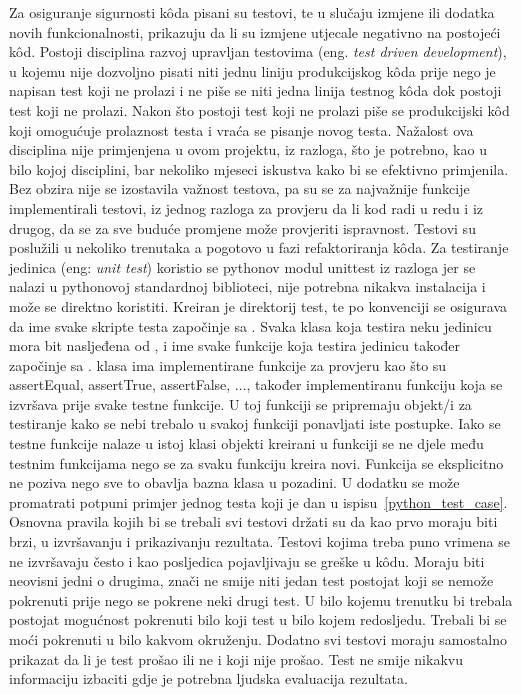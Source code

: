 Za osiguranje sigurnosti k\^oda pisani su testovi, te u slučaju izmjene ili dodatka novih funkcionalnosti, prikazuju da li su izmjene utjecale negativno na postojeći k\^od. Postoji disciplina razvoj upravljan testovima (eng. \textit{test driven development}), u kojemu nije dozvoljno pisati niti jednu liniju produkcijskog k\^oda prije nego je napisan test koji ne prolazi i ne piše se niti jedna linija testnog k\^oda dok postoji test koji ne prolazi. Nakon što postoji test koji ne prolazi piše se produkcijski k\^od koji omogućuje prolaznost testa i vraća se pisanje novog testa. Nažalost ova disciplina nije primjenjena u ovom projektu, iz razloga, što je potrebno, kao u bilo kojoj disciplini, bar nekoliko mjeseci iskustva kako bi se efektivno primjenila. Bez obzira nije se izostavila važnost testova, pa su se za najvažnije funkcije implementirali testovi, iz jednog razloga za provjeru da li kod radi u redu i iz drugog, da se za sve buduće promjene može provjeriti ispravnost. Testovi su poslužili u nekoliko trenutaka a pogotovo u fazi refaktoriranja k\^oda. Za testiranje jedinica (eng: \textit{unit test}) koristio se pythonov modul unittest iz razloga jer se nalazi u pythonovoj standardnoj biblioteci, nije potrebna nikakva instalacija i može se direktno koristiti. Kreiran je direktorij test, te po konvenciji se osigurava da ime svake skripte testa započinje sa . Svaka klasa koja testira neku jedinicu mora bit nasljeđena od , i ime svake funkcije koja testira jedinicu također započinje sa .  klasa ima implementirane funkcije za provjeru kao što su assertEqual, assertTrue, assertFalse, ..., također implementiranu funkciju  koja se izvršava prije svake testne funkcije. U toj funkciji se pripremaju objekt/i za testiranje kako se nebi trebalo u svakoj funkciji ponavljati iste postupke. Iako se testne funkcije nalaze u istoj klasi objekti kreirani u  funkciji se ne djele među testnim funkcijama nego se za svaku funkciju kreira novi. Funkcija  se eksplicitno ne poziva nego sve to obavlja bazna klasa  u pozadini. U dodatku se može promatrati potpuni primjer jednog testa koji je dan u ispisu~\ref{python_test_case}. Osnovna pravila kojih bi se trebali svi testovi držati su da kao prvo moraju biti brzi, u izvršavanju i prikazivanju rezultata. Testovi kojima treba puno vrimena se ne izvršavaju često i kao posljedica pojavljivaju se greške u k\^odu. Moraju biti neovisni jedni o drugima, znači ne smije niti jedan test postojat koji se nemože pokrenuti prije nego se pokrene neki drugi test. U bilo kojemu trenutku bi trebala postojat mogućnost pokrenuti bilo koji test u bilo kojem redosljedu. Trebali bi se moći pokrenuti u bilo kakvom okruženju. Dodatno svi testovi moraju samostalno prikazat da li je test prošao ili ne i koji nije prošao. Test ne smije nikakvu informaciju izbaciti gdje je potrebna ljudska evaluacija rezultata.


